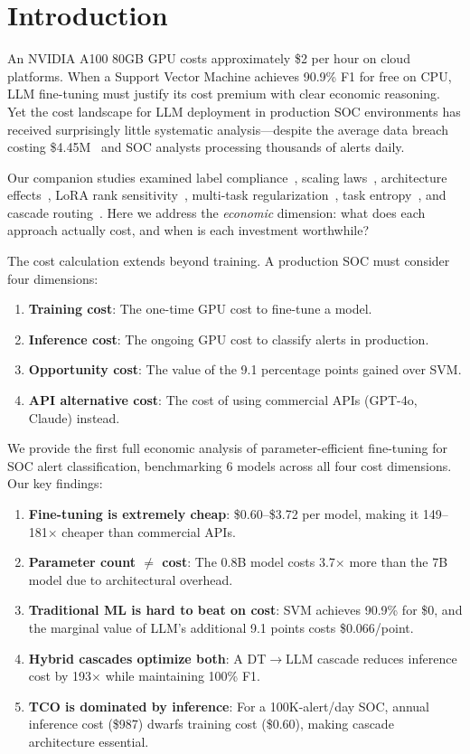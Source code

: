 \documentclass[review,3p]{elsarticle}
\begin{document}
\section{Introduction}

An NVIDIA A100 80GB GPU costs approximately \$2 per hour on cloud platforms. When a Support Vector Machine achieves 90.9\% F1 for free on CPU, LLM fine-tuning must justify its cost premium with clear economic reasoning. Yet the cost landscape for LLM deployment in production SOC environments has received surprisingly little systematic analysis---despite the average data breach costing \$4.45M~\cite{ponemon2023} and SOC analysts processing thousands of alerts daily.

Our companion studies examined label compliance~\cite{p3}, scaling laws~\cite{p6}, architecture effects~\cite{p21}, LoRA rank sensitivity~\cite{p22}, multi-task regularization~\cite{p15}, task entropy~\cite{p8}, and cascade routing~\cite{p5}. Here we address the \emph{economic} dimension: what does each approach actually cost, and when is each investment worthwhile?

The cost calculation extends beyond training. A production SOC must consider four dimensions:
\begin{enumerate}
\item \textbf{Training cost}: The one-time GPU cost to fine-tune a model.
\item \textbf{Inference cost}: The ongoing GPU cost to classify alerts in production.
\item \textbf{Opportunity cost}: The value of the 9.1 percentage points gained over SVM.
\item \textbf{API alternative cost}: The cost of using commercial APIs (GPT-4o, Claude) instead.
\end{enumerate}

We provide the first full economic analysis of parameter-efficient fine-tuning for SOC alert classification, benchmarking 6 models across all four cost dimensions. Our key findings:
\begin{enumerate}
\item \textbf{Fine-tuning is extremely cheap}: \$0.60--\$3.72 per model, making it 149--181$\times$ cheaper than commercial APIs.
\item \textbf{Parameter count $\neq$ cost}: The 0.8B model costs 3.7$\times$ more than the 7B model due to architectural overhead.
\item \textbf{Traditional ML is hard to beat on cost}: SVM achieves 90.9\% for \$0, and the marginal value of LLM's additional 9.1 points costs \$0.066/point.
\item \textbf{Hybrid cascades optimize both}: A DT$\to$LLM cascade reduces inference cost by 193$\times$ while maintaining 100\% F1.
\item \textbf{TCO is dominated by inference}: For a 100K-alert/day SOC, annual inference cost (\$987) dwarfs training cost (\$0.60), making cascade architecture essential.
\end{enumerate}
\end{document}
